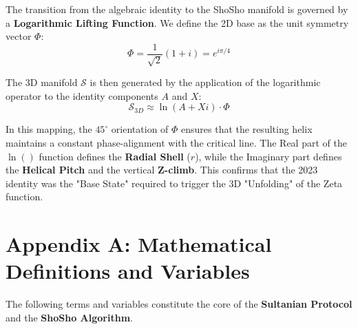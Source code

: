 \documentclass[11pt,a4paper]{article}
\begin{document}
The transition from the algebraic identity to the ShoSho manifold is governed by a \textbf{Logarithmic Lifting Function}. We define the 2D base as the unit symmetry vector $\Phi$:
\begin{equation}
    \Phi = \frac{1}{\sqrt{2}}(1+i) = e^{i\pi/4}
\end{equation}

The 3D manifold $\mathcal{S}$ is then generated by the application of the logarithmic operator to the identity components $A$ and $X$:
\begin{equation}
    \mathcal{S}_{3D} \approx \ln(A + Xi) \cdot \Phi
\end{equation}

In this mapping, the $45^\circ$ orientation of $\Phi$ ensures that the resulting helix maintains a constant phase-alignment with the critical line. The Real part of the $\ln()$ function defines the \textbf{Radial Shell} ($r$), while the Imaginary part defines the \textbf{Helical Pitch} and the vertical \textbf{Z-climb}. This confirms that the 2023 identity was the "Base State" required to trigger the 3D "Unfolding" of the Zeta function.

\section*{Appendix A: Mathematical Definitions and Variables}

The following terms and variables constitute the core of the \textbf{Sultanian Protocol} and the \textbf{ShoSho Algorithm}.
\end{document}
